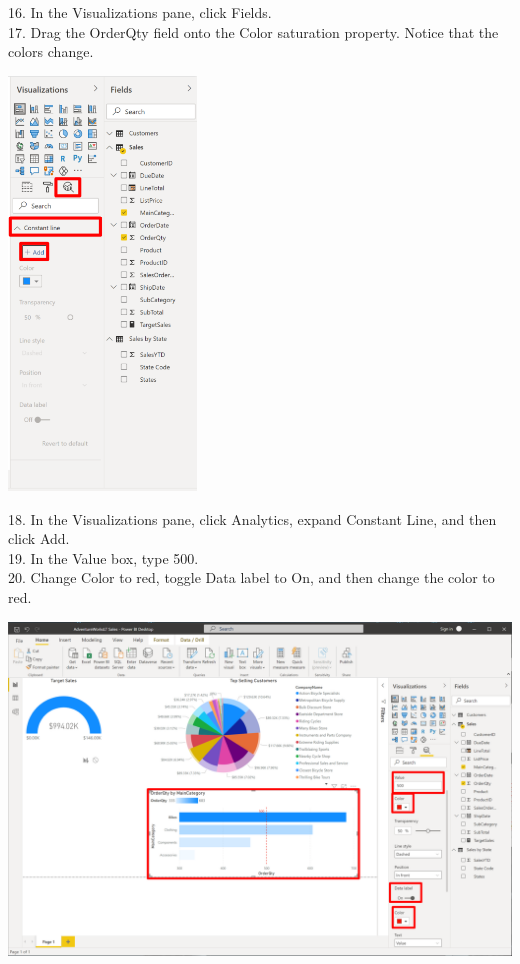 \documentclass[12pt,letterpaper]{article}
\begin{document}
16. In the Visualizations pane, click Fields.
\\17. Drag the OrderQty field onto the Color saturation property. Notice that the colors change.
\begin{center}
    \includegraphics[width=5cm]{img/86.png}
\end{center}
18. In the Visualizations pane, click Analytics, expand Constant Line, and then click Add.
\\19. In the Value box, type 500.
\\20. Change Color to red, toggle Data label to On, and then change the color to red.
\begin{center}
    \includegraphics[width=15cm]{img/87.png}
\end{center}
\end{document}
